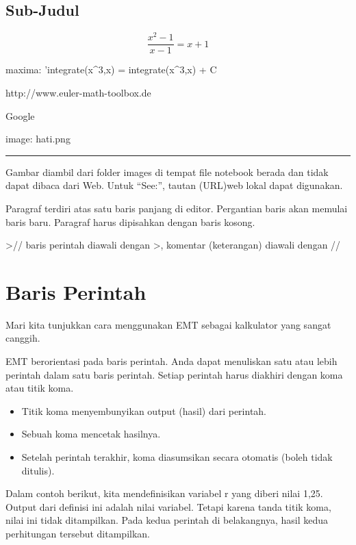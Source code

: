 \documentclass[
]{book}
\begin{document}
\section{Sub-Judul}\label{sub-judul}

\[\frac{x^2-1}{x-1} = x + 1\]

maxima: 'integrate(x\^{}3,x) = integrate(x\^{}3,x) + C

http://www.euler-math-toolbox.de

Google

image: hati.png

\begin{center}\rule{0.5\linewidth}{0.5pt}\end{center}

Gambar diambil dari folder images di tempat file notebook berada dan tidak dapat dibaca dari Web. Untuk ``See:'', tautan (URL)web lokal dapat digunakan.

Paragraf terdiri atas satu baris panjang di editor. Pergantian baris akan memulai baris baru. Paragraf harus dipisahkan dengan baris kosong.

\textgreater// baris perintah diawali dengan \textgreater, komentar (keterangan) diawali dengan //

\chapter{Baris Perintah}\label{baris-perintah}

Mari kita tunjukkan cara menggunakan EMT sebagai kalkulator yang sangat canggih.

EMT berorientasi pada baris perintah. Anda dapat menuliskan satu atau lebih perintah dalam satu baris perintah. Setiap perintah harus diakhiri dengan koma atau titik koma.

\begin{itemize}
\item
  Titik koma menyembunyikan output (hasil) dari perintah.
\item
  Sebuah koma mencetak hasilnya.
\item
  Setelah perintah terakhir, koma diasumsikan secara otomatis (boleh tidak ditulis).
\end{itemize}

Dalam contoh berikut, kita mendefinisikan variabel r yang diberi nilai 1,25. Output dari definisi ini adalah nilai variabel. Tetapi karena tanda titik koma, nilai ini tidak ditampilkan. Pada kedua perintah di belakangnya, hasil kedua perhitungan tersebut ditampilkan.
\end{document}
